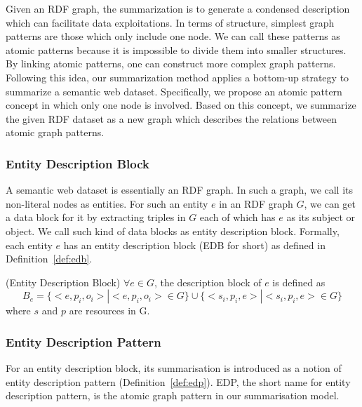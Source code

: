Given an RDF graph, the summarization is to generate a condensed description which can facilitate data exploitations. In terms of structure, simplest graph patterns are those which only include one node. We can call these patterns as atomic patterns because it is impossible to divide them into smaller structures. By linking atomic patterns, one can construct more complex graph patterns. Following this idea, our summarization method applies a bottom-up strategy to summarize a semantic web dataset. Specifically, we propose an atomic pattern concept in which only one node is involved. Based on this concept, we summarize the given RDF dataset as a new graph which describes the relations between atomic graph patterns.

\subsubsection{Entity Description Block}
A semantic web dataset is essentially an RDF graph. In such a graph, we call its non-literal nodes as entities. For such an entity $e$ in an RDF graph $G$, we can get a data block for it by extracting triples in $G$ each of which has $e$ as its subject or object. We call such kind of data blocks as entity description block. Formally, each entity $e$ has an entity description block (EDB for short) as defined in Definition~\ref{def:edb}.

\begin{definition}
\label{def:edb}
 (Entity Description Block)
$\forall e \in G$, the description block of $e$ is defined as 
\begin{equation}
B_e= \{<e,p_i,o_i>|<e,p_i,o_i> \in G\} \cup \{<s_i,p_i,e>|<s_i,p_i,e> \in G\}
\end{equation}
where $s$ and $p$ are resources in G.
\end{definition}

\subsubsection{Entity Description Pattern}
For an entity description block, its summarisation is introduced as a notion of entity description pattern (Definition~\ref{def:edp}). EDP, the short name for entity description pattern, is the atomic graph pattern in our summarisation model. 

